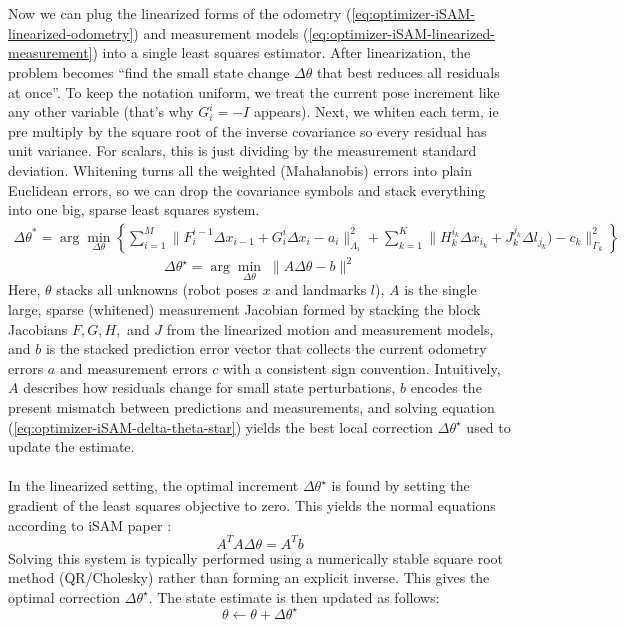 \\ \\
Now we can plug the linearized forms of the odometry (\ref{eq:optimizer-iSAM-linearized-odometry}) and measurement models (\ref{eq:optimizer-iSAM-linearized-measurement}) into a single least squares estimator. After linearization, the problem becomes ``find the small state change $\Delta\theta$ that best reduces all residuals at once''. To keep the notation uniform, we treat the current pose increment like any other variable (that's why $G_{i}^{i}=-I$ appears). Next, we whiten each term, ie pre multiply by the square root of the inverse covariance so every residual has unit variance. For scalars, this is just dividing by the measurement standard deviation. Whitening turns all the weighted (Mahalanobis) errors into plain Euclidean errors, so we can drop the covariance symbols and stack everything into one big, sparse least squares system.
$$
    \begin{aligned}
        \Delta\theta^{*} = 
        \arg\min_{\Delta\theta}\left\{ 
            \sum_{i=1}^{M}{\|F_{i}^{i-1}\Delta x_{i-1} + G_{i}^{i}\Delta x_{i} - a_i\|_{\Lambda_i}^{2}} +
            \sum_{k=1}^{K}{\|H_{k}^{i_k}\Delta x_{i_k} + J_{k}^{j_k} \Delta l_{j_k}) - c_k\|_{\Gamma_k}^{2}}
            \right\}
    \end{aligned}
$$
\begin{equation}
    \Delta\theta^\star = \arg\min_{\Delta\theta}\; \|A\Delta\theta - b\|^2
    \label{eq:optimizer-iSAM-delta-theta-star}
\end{equation}
Here, $\theta$ stacks all unknowns (robot poses $x$ and landmarks $l$), $A$ is the single large, sparse (whitened) measurement Jacobian formed by stacking the block Jacobians $F, G, H,$ and $J$ from the linearized motion and measurement models, and $b$ is the stacked prediction error vector that collects the current odometry errors $a$ and measurement errors $c$ with a consistent sign convention. Intuitively, $A$ describes how residuals change for small state perturbations, $b$ encodes the present mismatch between predictions and measurements, and solving equation (\ref{eq:optimizer-iSAM-delta-theta-star}) yields the best local correction $\Delta\theta^\star$ used to update the estimate.
\\ \\
In the linearized setting, the optimal increment $\Delta\theta^\star$ is found by setting the gradient of the least squares objective to zero. This yields the normal equations according to iSAM paper \cite{iSAM_paper}:
$$
    A^{T}A\Delta\theta = A^{T}b
$$
Solving this system is typically performed using a numerically stable square root method (QR/Cholesky) rather than forming an explicit inverse. This gives the optimal correction $\Delta\theta^\star$. The state estimate is then updated as follows:
$$
    \theta \leftarrow \theta + \Delta\theta^\star
$$



